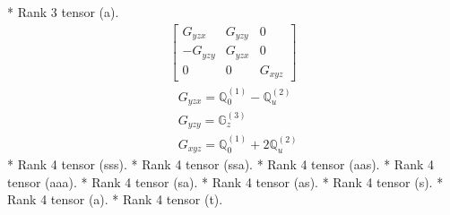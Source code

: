 \documentclass[fleqn,8pt,landscape]{jsarticle}
\begin{document}
* Rank 3 tensor (a).
\begin{align*}
\begin{bmatrix} G_{yzx} & G_{yzy} & 0 \\ - G_{yzy} & G_{yzx} & 0 \\ 0 & 0 & G_{xyz} \end{bmatrix}
\end{align*}
\begin{align*}
& G_{yzx} = \mathbb{Q}_{0}^{(1)} - \mathbb{Q}_{u}^{(2)} \\
& G_{yzy} = \mathbb{G}_{z}^{(3)} \\
& G_{xyz} = \mathbb{Q}_{0}^{(1)} + 2 \mathbb{Q}_{u}^{(2)}
\end{align*}
* Rank 4 tensor (sss).
* Rank 4 tensor (ssa).
* Rank 4 tensor (aas).
* Rank 4 tensor (aaa).
* Rank 4 tensor (sa).
* Rank 4 tensor (as).
* Rank 4 tensor (s).
* Rank 4 tensor (a).
* Rank 4 tensor (t).
\end{document}
